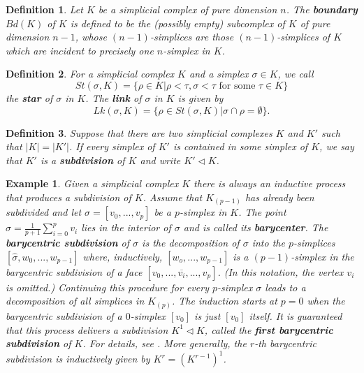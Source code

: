 \documentclass[11pt]{book}
\newtheorem{definition}{Definition}
\newtheorem{example}{Example}
\begin{document}
\begin{definition}
Let $K$ be a simplicial complex of pure dimension $n$. The \textbf{boundary} $Bd(K)$ of $K$ is defined to be the (possibly empty) subcomplex of $K$ of pure dimension $n-1$, whose $(n-1)$-simplices are those $(n-1)$-simplices of $K$ which are incident to precisely one $n$-simplex in $K$.
\end{definition}

\begin{definition}
For a simplicial complex $K$ and a simplex $\sigma \in K$, we call
\begin{equation*}
St(\sigma,K)= \{ \rho \in K | \rho < \tau, \sigma < \tau \text{ for some } \tau \in K \}  
\end{equation*}
the \textbf{star} of $\sigma$ in $K$. The \textbf{link} of $\sigma$ in $K$ is given by
\begin{equation*}
Lk(\sigma,K) = \{ \rho \in St(\sigma,K) | \sigma \cap \rho = \emptyset \}.
\end{equation*}
\end{definition}

\begin{definition}
Suppose that there are two simplicial complexes $K$ and $K'$ such that $|K| = |K'|$. If every simplex of $K'$ is contained in some simplex of $K$, we say that $K'$ is a \textbf{subdivision} of $K$ and write $K' \lhd K$.
\end{definition}


\begin{example}
Given a simplicial complex $K$ there is always an inductive process that produces a subdivision of $K$. Assume that $K_{(p-1)}$ has already been subdivided and let $\sigma=[v_0,...,v_p]$ be a $p$-simplex in $K$. The point $\hat{\sigma}=\frac{1}{p+1} \sum_{i=0}^p v_i$ lies in the interior of $\sigma$ and is called its \textbf{barycenter}. The \textbf{barycentric subdivision} of $\sigma$ is the decomposition of $\sigma$ into the $p$-simplices $[\hat{\sigma},w_0,...,w_{p-1}]$ where, inductively, $[w_o,...,w_{p-1}]$ is a $(p-1)$-simplex in the barycentric subdivision of a face $[v_0,...,\overline{v_i},...,v_p]$. (In this notation, the vertex $v_i$ is omitted.) Continuing this procedure for every $p$-simplex $\sigma$ leads to a decomposition of all simplices in $K_{(p)}$. The induction starts at $p=0$ when the barycentric subdivision of a $0$-simplex $[v_0]$ is just $[v_0]$ itself. It is guaranteed that this process delivers a subdivision $K^1 \lhd K$, called the \textbf{first barycentric subdivision} of $K$. For details, see \cite{hatcher}. More generally, the $r$-th barycentric subdivision is inductively given by $K^r=(K^{r-1})^1$.
\end{example}
\end{document}
